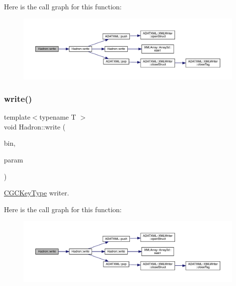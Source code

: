 Here is the call graph for this function\+:
\nopagebreak
\begin{figure}[H]
\begin{center}
\leavevmode
\includegraphics[width=350pt]{d1/daf/namespaceHadron_a0051134178fb8346e89720a478b8a8f1_cgraph}
\end{center}
\end{figure}
\mbox{\label{namespaceHadron_aa23076bfdc2f1ebd99330197de102a6d}} 
\subsubsection{\texorpdfstring{write()}{write()}\hspace{0.1cm}{\footnotesize\ttfamily [9/95]}}
{\footnotesize\ttfamily template$<$typename T $>$ \\
void Hadron\+::write (\begin{DoxyParamCaption}\item[{\mbox{\hyperlink{classADATIO_1_1BinaryWriter}{Binary\+Writer}} \&}]{bin,  }\item[{const \mbox{\hyperlink{structHadron_1_1CGCKeyType}{C\+G\+C\+Key\+Type}}$<$ T $>$ \&}]{param }\end{DoxyParamCaption})\hspace{0.3cm}{\ttfamily [inline]}}



\mbox{\hyperlink{structHadron_1_1CGCKeyType}{C\+G\+C\+Key\+Type}} writer. 

Here is the call graph for this function\+:
\nopagebreak
\begin{figure}[H]
\begin{center}
\leavevmode
\includegraphics[width=350pt]{d1/daf/namespaceHadron_aa23076bfdc2f1ebd99330197de102a6d_cgraph}
\end{center}
\end{figure}
\mbox{\label{namespaceHadron_a4d280edd65eda86698eae0d619c81a47}} 
